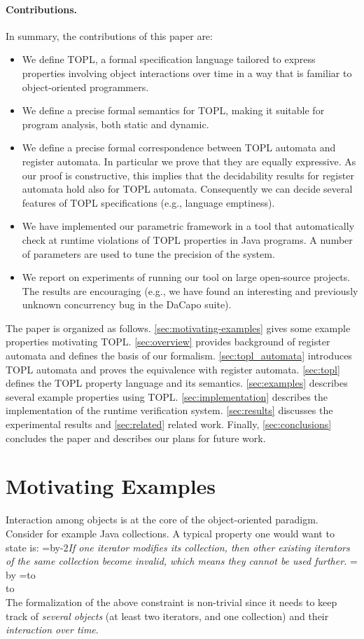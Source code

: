 \documentclass{article} %
\newcommand{\quoteindent}{1.5\parindent} %
\newcommand{\eqquote}[2]{{%
  \refstepcounter{equation}\label{#2}%
  \newdimen\qi\qi=\quoteindent
  \setbox0=\vbox{\advance\hsize by-2\qi\noindent\em#1}%
  \newdimen\x\x=\ht0 \advance\x by\dp0%
  \setbox1=\vbox to\x{\vss\hbox{(\arabic{equation})}\vss}%
  \leavevmode\\[1ex]%
  \hbox to\hsize{\hskip\qi\box0\hfil\box1}%
  \\[1ex]}}
\theoremstyle{definition}
\theoremstyle{remark}
\begin{document}
\paragraph{Contributions.}
In summary, the contributions of this paper are:
\begin{itemize}
\item We define TOPL, a formal specification language tailored to express properties involving object interactions over time in a way that is familiar to object-oriented programmers.
\item We define a precise formal semantics for TOPL, making it suitable for program analysis, both static and dynamic.
\item We define a precise formal correspondence between TOPL automata and register automata. 
In particular we prove that they are equally expressive. As our proof is constructive, this implies that the decidability results for register automata hold also for TOPL automata. Consequently we can decide several features of TOPL specifications (e.g., language emptiness).
\item We have implemented our parametric framework  in a tool that automatically check at runtime violations of TOPL properties in Java programs. A number of parameters are used to tune the precision of the system.

\item We report on experiments of running our tool on large open-source projects. The results are encouraging (e.g., we have found
an interesting and previously unknown  concurrency bug in the DaCapo suite). 
\end{itemize}


The paper is organized as follows.
\autoref{sec:motivating-examples} gives some example properties motivating TOPL.
\autoref{sec:overview} provides background of register automata and defines the basis of our formalism.
\autoref{sec:topl_automata} introduces TOPL automata and proves the equivalence with register automata. 
\autoref{sec:topl} defines the TOPL property language and its semantics.
\autoref{sec:examples} describes several example properties using TOPL\null.
\autoref{sec:implementation} describes  the implementation of the runtime  verification system.
\autoref{sec:results} discusses the experimental results and \autoref{sec:related}  related work.
Finally, \autoref{sec:conclusions} concludes the paper and describes our plans for future work.

\section{Motivating Examples} %
\label{sec:motivating-examples}
Interaction among objects is at the core of the object-oriented paradigm.
Consider for example  Java collections. A typical property one would want to state  is:
\eqquote{If one iterator modifies its collection, then other existing iterators of the same collection become invalid, which means they cannot be used further.}{q:concur-it}
The formalization of the above constraint is non-trivial since it needs to keep track of {\em several objects} (at least two iterators, and one collection) and their {\em interaction over time}.
\end{document}
